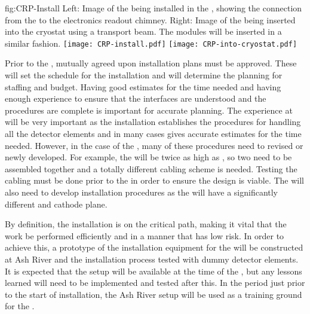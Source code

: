 \begin{dunefigure}{fig:CRP-Install}
  {Left: Image of the   being installed in
  the , showing the connection from the  to the
  electronics readout chimney. Right: Image of the  being
  inserted into the cryostat using a transport beam.  The \dual {} modules will be inserted in a similar fashion.}
\texttt{[image: CRP-install.pdf]}
\texttt{[image: CRP-into-cryostat.pdf]}
\end{dunefigure}

Prior to the , mutually agreed upon installation plans must
be approved. These will set the schedule for the installation and will
determine the planning for staffing and budget. Having good estimates
for the time needed and having enough experience to ensure that the
interfaces are understood and the procedures are complete is important
for accurate planning. The experience at  will be
very important as the  installation establishes the
procedures for handling all the detector elements and in many cases
gives accurate estimates for the time needed. However, in the case of
the , many of these procedures need to revised or
newly developed. For example, the  will be twice as high as
, so two  need to be assembled together
and a totally different cabling scheme is needed. Testing the
cabling must be done prior to the  %
in order to
ensure the design is viable. The  will also need to develop
installation procedures as the  
will have a significantly different  and cathode plane. 

By definition, the installation  is on the critical path, making it vital
that the work be performed efficiently and in a manner that has low
risk. In order to achieve this, a prototype of the installation
equipment for the   will be constructed at Ash
River and the installation process tested with dummy detector
elements. It is expected that the setup will be available at the time
of the , but any lessons learned will need to be implemented and
tested after this. In the period just prior to the start of
installation, the Ash River setup will be used as a training ground for
the .



